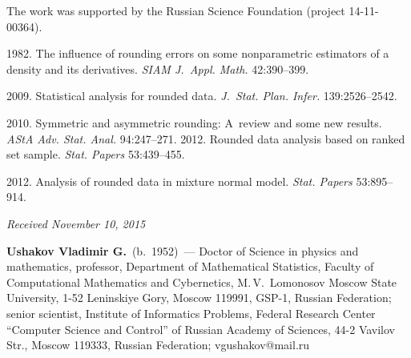 

\Ack
    \noindent
The work was supported by the Russian Science Foundation
(project 14-11-00364).



  \begin{multicols}{2}

\renewcommand{\bibname}{\protect\rmfamily References}

{\small\frenchspacing
 {%
 \begin{thebibliography}{9}

 1982. The influence of rounding errors on some nonparametric estimators
of a density and its derivatives. \textit{SIAM J.~Appl. Math.} 42:390--399.

 2009. Statistical analysis for
rounded data. \textit{J.~Stat. Plan. Infer.} 139:2526--2542.

 2010. 
Symmetric and asymmetric rounding:
A~review and some new results. \textit{AStA Adv. Stat. Anal.} 94:247--271.
 2012. 
Rounded data analysis based on ranked
set sample. \textit{Stat. Papers} 53:439--455.

 2012. Analysis of rounded data in mixture normal model.
\textit{Stat. Papers} 53:895--914.

\end{thebibliography}

 }
 }

\end{multicols}

\vspace*{-3pt}

\hfill{\small\textit{Received November 10, 2015}}


\Contr

\noindent
\textbf{Ushakov Vladimir G.}\ (b.\ 1952)~---
Doctor of Science in physics and mathematics, professor, Department of Mathematical 
Statistics, Faculty of Computational Mathematics and Cybernetics, 
M.\,V.~Lomonosov Moscow State University, 1-52 Leninskiye Gory, Moscow 119991, 
GSP-1, Russian Federation; senior scientist, Institute of Informatics Problems, 
Federal Research Center ``Computer Science and Control'' 
of Russian Academy of Sciences, 44-2 Vavilov Str., Moscow 119333, Russian Federation; 
vgushakov@mail.ru 

